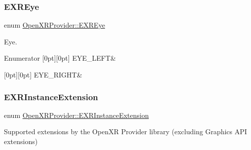 \subsubsection{\texorpdfstring{EXREye}{EXREye}}
{\footnotesize\ttfamily enum \mbox{\hyperlink{namespace_open_x_r_provider_a8aa379869e30772896e6c468eb54f155}{Open\+X\+R\+Provider\+::\+E\+X\+R\+Eye}}}



Eye. 

\begin{DoxyEnumFields}{Enumerator}
[0pt][0pt]{}\mbox{\label{namespace_open_x_r_provider_a8aa379869e30772896e6c468eb54f155a1f7295c2ac801bf776369e51ad0f7e84}} 
E\+Y\+E\+\_\+\+L\+E\+FT&\\
\hline

[0pt][0pt]{}\mbox{\label{namespace_open_x_r_provider_a8aa379869e30772896e6c468eb54f155ae4e90da36b75bc313108f4ea7283da97}} 
E\+Y\+E\+\_\+\+R\+I\+G\+HT&\\
\hline

\end{DoxyEnumFields}
\mbox{\label{namespace_open_x_r_provider_ac7a3555ea86a858a7d56afa5dfb16cc3}} 
\subsubsection{\texorpdfstring{EXRInstanceExtension}{EXRInstanceExtension}}
{\footnotesize\ttfamily enum \mbox{\hyperlink{namespace_open_x_r_provider_ac7a3555ea86a858a7d56afa5dfb16cc3}{Open\+X\+R\+Provider\+::\+E\+X\+R\+Instance\+Extension}}}



Supported extensions by the Open\+XR Provider library (excluding Graphics A\+PI extensions) 

